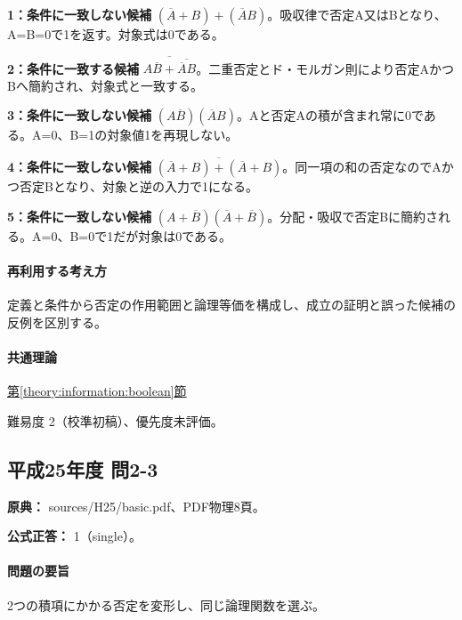 \noindent\textbf{1：条件に一致しない候補} \((\overline A+B)+(\overline A B)\)。吸収律で否定A又はBとなり、A=\allowbreak{}B=\allowbreak{}0で1を返す。対象式は0である。\par

\noindent\textbf{2：条件に一致する候補} \(\overline{A\overline B+\overline{\overline A B}}\)。二重否定とド・モルガン則により否定AかつBへ簡約され、対象式と一致する。\par

\noindent\textbf{3：条件に一致しない候補} \((A\overline B)(\overline A B)\)。Aと否定Aの積が含まれ常に0である。A=\allowbreak{}0、B=\allowbreak{}1の対象値1を再現しない。\par

\noindent\textbf{4：条件に一致しない候補} \(\overline{(\overline A+B)+(\overline A+B)}\)。同一項の和の否定なのでAかつ否定Bとなり、対象と逆の入力で1になる。\par

\noindent\textbf{5：条件に一致しない候補} \((A+\overline B)(\overline A+\overline B)\)。分配・吸収で否定Bに簡約される。A=\allowbreak{}0、B=\allowbreak{}0で1だが対象は0である。\par

\paragraph{再利用する考え方} 定義と条件から否定の作用範囲と論理等価を構成し、成立の証明と誤った候補の反例を区別する。

\paragraph{共通理論} \hyperref[theory:information:boolean]{第\ref*{theory:information:boolean}節}

\par 難易度 2（校準初稿）、優先度未評価。

\subsection{平成25年度 問2-3}
\label{q:h25-reg-basic-2-3}

\noindent\textbf{原典：} sources/H25/basic.pdf、PDF物理8頁。

\textbf{公式正答：} 1（single）。

\paragraph{問題の要旨} 2つの積項にかかる否定を変形し、同じ論理関数を選ぶ。

